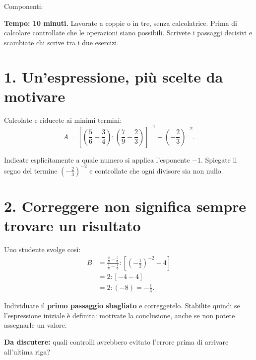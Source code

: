 \documentclass[11pt,a4paper]{article}
\begin{document}
Componenti: \dotfill

\textbf{Tempo: 10 minuti.} Lavorate a coppie o in tre, senza calcolatrice. Prima di calcolare controllate che le operazioni siano possibili. Scrivete i passaggi decisivi e scambiate chi scrive tra i due esercizi.

\section*{1. Un'espressione, più scelte da motivare}

Calcolate e riducete ai minimi termini:
\[
A=
\left[
\left(\frac56-\frac34\right):
\left(\frac79-\frac23\right)
\right]^{-1}
-\left(-\frac23\right)^{-2}.
\]

Indicate esplicitamente a quale numero si applica l'esponente $-1$. Spiegate il segno del termine $\left(-\frac23\right)^{-2}$ e controllate che ogni divisore sia non nullo.

\vspace{5cm}

\section*{2. Correggere non significa sempre trovare un risultato}

Uno studente svolge così:
\[
\begin{aligned}
B&=\frac{\frac23-\frac56}{\frac14-\frac13}
 :\left[\left(-\frac12\right)^{-2}-4\right]\\[6pt]
 &=2:[-4-4]\\[4pt]
 &=2:(-8)=-\frac14.
\end{aligned}
\]

Individuate il \textbf{primo passaggio sbagliato} e correggetelo. Stabilite quindi se l'espressione iniziale è definita: motivate la conclusione, anche se non potete assegnarle un valore.

\vfill
\textbf{Da discutere:} quali controlli avrebbero evitato l'errore prima di arrivare all'ultima riga?
\end{document}
